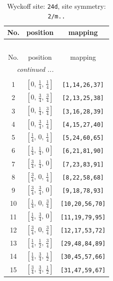 \documentclass[fleqn,8pt]{jsarticle}
\begin{document}
\begin{longtable}{ccc}
\caption{Wyckoff site: {\tt 24d}, site symmetry: {\tt 2/m..}}
 \\
 \hline \hline
No. & position & mapping \\ \hline \endfirsthead

\multicolumn{2}{l}{\tablename\ \thetable{}} \\
 \hline \hline
No. & position & mapping \\ \hline \endhead

 \hline \hline
\multicolumn{2}{r}{\footnotesize\it continued ...} \\ \endfoot

 \hline \hline
\multicolumn{2}{r}{} \\ \endlastfoot

1 & $\left[ 0,\, \frac{1}{4},\, \frac{1}{4} \right]$ & {\tt [1,14,26,37]} \\ \hline
2 & $\left[ 0,\, \frac{3}{4},\, \frac{3}{4} \right]$ & {\tt [2,13,25,38]} \\ \hline
3 & $\left[ 0,\, \frac{1}{4},\, \frac{3}{4} \right]$ & {\tt [3,16,28,39]} \\ \hline
4 & $\left[ 0,\, \frac{3}{4},\, \frac{1}{4} \right]$ & {\tt [4,15,27,40]} \\ \hline
5 & $\left[ \frac{1}{4},\, 0,\, \frac{1}{4} \right]$ & {\tt [5,24,60,65]} \\ \hline
6 & $\left[ \frac{1}{4},\, \frac{1}{4},\, 0 \right]$ & {\tt [6,21,81,90]} \\ \hline
7 & $\left[ \frac{3}{4},\, \frac{1}{4},\, 0 \right]$ & {\tt [7,23,83,91]} \\ \hline
8 & $\left[ \frac{3}{4},\, 0,\, \frac{1}{4} \right]$ & {\tt [8,22,58,68]} \\ \hline
9 & $\left[ \frac{3}{4},\, \frac{3}{4},\, 0 \right]$ & {\tt [9,18,78,93]} \\ \hline
10 & $\left[ \frac{1}{4},\, 0,\, \frac{3}{4} \right]$ & {\tt [10,20,56,70]} \\ \hline
11 & $\left[ \frac{1}{4},\, \frac{3}{4},\, 0 \right]$ & {\tt [11,19,79,95]} \\ \hline
12 & $\left[ \frac{3}{4},\, 0,\, \frac{3}{4} \right]$ & {\tt [12,17,53,72]} \\ \hline
13 & $\left[ \frac{1}{4},\, \frac{1}{2},\, \frac{3}{4} \right]$ & {\tt [29,48,84,89]} \\ \hline
14 & $\left[ \frac{1}{4},\, \frac{3}{4},\, \frac{1}{2} \right]$ & {\tt [30,45,57,66]} \\ \hline
15 & $\left[ \frac{3}{4},\, \frac{3}{4},\, \frac{1}{2} \right]$ & {\tt [31,47,59,67]} \\ \hline

\end{longtable}
\end{document}

